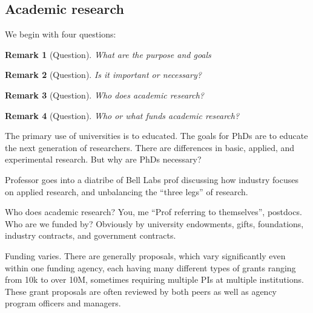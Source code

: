 \documentclass[10pt, oneside]{article}
\newtheorem{rem}{Remark}
\begin{document}
\subsection{Academic research}
We begin with four questions:
\begin{rem}[Question]
    What are the purpose and goals
\end{rem}
\begin{rem}[Question]
    Is it important or necessary?
\end{rem}
\begin{rem}[Question]
Who does academic research?
\end{rem}
\begin{rem}[Question]
    Who or what funds academic research?
\end{rem}
The primary use of universities is to educated. The goals for PhDs are to educate the next generation of researchers. There are differences in basic, applied, and experimental research. But why are PhDs necessary? 

Professor goes into a diatribe of Bell Labs prof discussing how industry focuses on applied research, and unbalancing the ``three legs'' of research. 

Who does academic research? You, me ``Prof referring to themselves'', postdocs. Who are we funded by? Obviously by university endowments, gifts, foundations, industry contracts, and government contracts. 

Funding varies. There are generally proposals, which vary significantly even within one funding agency, each having many different types of grants ranging from 10k to over 10M, sometimes requiring multiple PIs at multiple institutions. These grant proposals are often reviewed by both peers as well as agency program officers and managers. 
\end{document}
